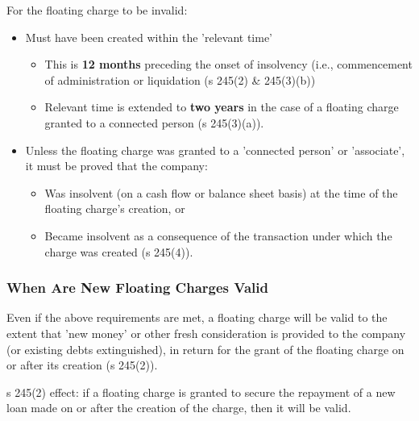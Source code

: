 \documentclass[
]{article}
\providecommand{\tightlist}{%
  \setlength{\itemsep}{0pt}\setlength{\parskip}{0pt}}
\begin{document}
For the floating charge to be invalid:

\begin{itemize}
\tightlist
\item
  Must have been created within the 'relevant time'

  \begin{itemize}
  \tightlist
  \item
    This is \textbf{12 months} preceding the onset of insolvency (i.e.,
    commencement of administration or liquidation (s 245(2) \&
    245(3)(b))
  \item
    Relevant time is extended to \textbf{two years} in the case of a
    floating charge granted to a connected person (s 245(3)(a)).
  \end{itemize}
\item
  Unless the floating charge was granted to a 'connected person' or
  'associate', it must be proved that the company:

  \begin{itemize}
  \tightlist
  \item
    Was insolvent (on a cash flow or balance sheet basis) at the time of
    the floating charge's creation, or
  \item
    Became insolvent as a consequence of the transaction under which the
    charge was created (s 245(4)).
  \end{itemize}
\end{itemize}

\hypertarget{when-are-new-floating-charges-valid}{%
\subsubsection{When Are New Floating Charges
Valid}\label{when-are-new-floating-charges-valid}}

Even if the above requirements are met, a floating charge will be valid
to the extent that 'new money' or other fresh consideration is provided
to the company (or existing debts extinguished), in return for the grant
of the floating charge on or after its creation (s 245(2)).

s 245(2) effect: if a floating charge is granted to secure the repayment
of a new loan made on or after the creation of the charge, then it will
be valid.
\end{document}
